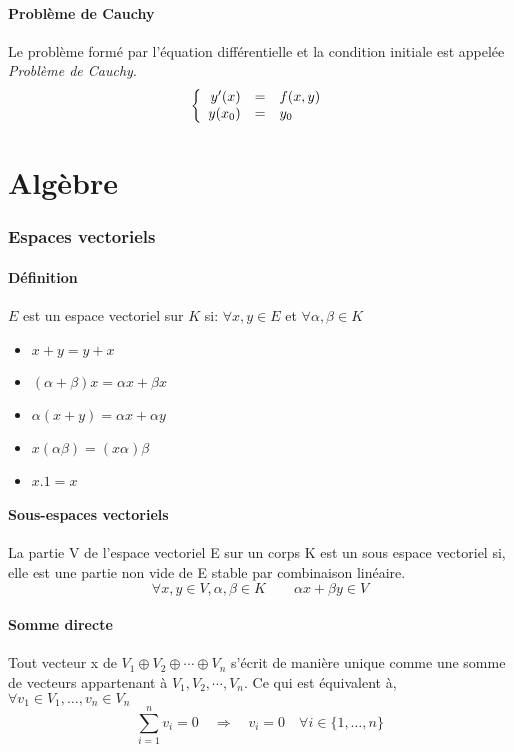 \subsection{Problème de Cauchy}
Le problème formé par l'équation différentielle et la condition initiale est appelée \emph{Problème de Cauchy}.\\
\[
\left\{
  \begin{array}{r c l}
    y'(x) &=& f(x,y)\\
    y(x_0) &=& y_0
  \end{array}
\right.
 \]

\part{Algèbre}
\section{Espaces vectoriels}
\subsection{Définition}
$E$ est un espace vectoriel sur $K$ si: $\forall x,y \in E$ et $\forall \alpha,\beta \in K$
\begin{itemize}
  \item $x + y = y + x$
  \item $(\alpha + \beta)x = \alpha{x} + \beta{x}$
  \item $\alpha{(x + y)} = \alpha{x} + \alpha{y}$
  \item $x(\alpha{\beta}) = (x\alpha{})\beta{}$
  \item $x.1 = x$
\end{itemize}
\subsection{Sous-espaces vectoriels}
La partie V de l'espace vectoriel E sur un corps K est un sous espace vectoriel si, elle est une partie non vide de E stable par combinaison linéaire.\\
\[ \forall{x, y} \in V, \alpha, \beta \in K \qquad \alpha x + \beta y \in V \]
\subsection{Somme directe}
Tout vecteur x de $V_1 \oplus V_2 \oplus \cdots \oplus V_n$ s'écrit de manière unique comme une somme de vecteurs appartenant à $V_1, V_2, \cdots , V_n$. Ce qui est équivalent à, $\forall v_1 \in V_1, \ldots, v_n \in V_n$
$$\sum_{i = 1}^{n} v_i = 0\quad\Rightarrow\quad v_i = 0\quad\forall i\in\{1, \ldots, n\}$$
